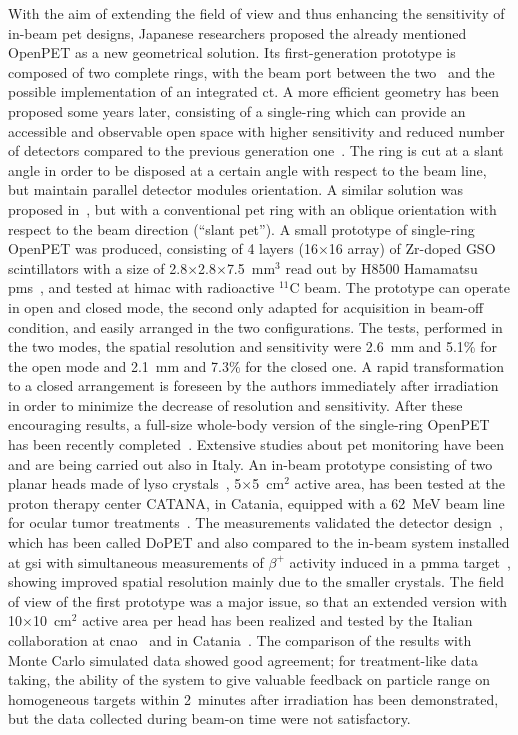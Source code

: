 With the aim of extending the field of view and thus enhancing the sensitivity of in-beam \gls{pet} designs, Japanese researchers proposed the already mentioned OpenPET as a new geometrical solution. Its first-generation prototype is composed of two complete rings, with the beam port between the two~\parencite{Yamaya2008, Yamaya2009} and the possible implementation of an integrated \gls{ct}. A more efficient geometry has been proposed some years later, consisting of a single-ring which can provide an accessible and observable open space with higher sensitivity and reduced number of detectors compared to the previous generation one~\parencite{Tashima2012}. The ring is cut at a slant angle in order to be disposed at a certain angle with respect to the beam line, but maintain parallel detector modules orientation. A similar solution was proposed in~\cite{Crespo2006}, but with a conventional \gls{pet} ring with an oblique orientation with respect to the beam direction (\enquote{slant \gls{pet}}). A small prototype of single-ring OpenPET was produced, consisting of 4 layers (16$\times$16 array) of Zr-doped GSO scintillators with a size of 2.8$\times$2.8$\times$7.5~mm$^3$ read out by H8500 Hamamatsu \glspl{pm}~\parencite{Tashima2016}, and tested at \gls{himac} with radioactive $^{11}$C beam. The prototype can operate in open and closed mode, the second only adapted for acquisition in beam-off condition, and easily arranged in the two configurations. The tests, performed in the two modes, the spatial resolution and sensitivity were 2.6~mm and 5.1\% for the open mode and 2.1~mm and 7.3\% for the closed one. A rapid transformation to a closed arrangement is foreseen by the authors immediately after irradiation in order to minimize the decrease of resolution and sensitivity. After these encouraging results, a full-size whole-body  version of the single-ring OpenPET has been recently completed~\parencite{Yamaya2017}.    
Extensive studies about \gls{pet} monitoring have been and are being carried out also in Italy. An in-beam prototype consisting of two planar heads made of \gls{lyso} crystals~\parencite{Vecchio2007}, 5$\times$5~cm$^2$ active area, has been tested at the proton therapy center CATANA, in Catania, equipped with a 62~MeV beam line for ocular tumor treatments~\parencite{Cirrone2003}. The measurements validated the detector design~\parencite{Attanasi2008}, which has been called DoPET and also compared to the in-beam system installed at \gls{gsi} with simultaneous measurements of $\beta^+$ activity induced in a \gls{pmma} target~\parencite{Attanasi2009}, showing improved spatial resolution mainly due to the smaller crystals. The field of view of the first prototype was a major issue, so that an extended version with 10$\times$10~cm$^2$ active area per head has been realized and tested by the Italian collaboration at \gls{cnao}~\parencite{Rosso2013, Kraan2015} and in Catania~\parencite{Sportelli2014, Camarlinghi2014}. The comparison of the results with Monte Carlo simulated data showed good agreement; for treatment-like data taking, the ability of the system to give valuable feedback on particle range on homogeneous targets within 2~minutes after irradiation has been demonstrated, but the data collected during beam-on time were not satisfactory.
